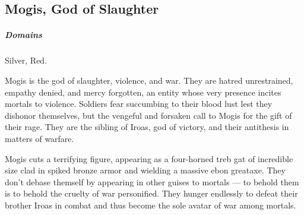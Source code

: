 
\vspace{13.5cm}

\subsection*{Mogis, God of Slaughter} \label{ssec::mogis}
    \subparagraph{Domains} Silver, Red.

    Mogis is the god of slaughter, violence, and war.
    They are hatred unrestrained, empathy denied, and mercy forgotten, an entity whose very presence incites mortals to violence.
    Soldiers fear succumbing to their blood lust lest they dishonor themselves, but the vengeful and forsaken call to Mogis for the gift of their rage.
    They are the sibling of Iroas, god of victory, and their antithesis in matters of warfare.


    Mogis cuts a terrifying figure, appearing as a four-horned treb gat of incredible size clad in spiked bronze armor and wielding a massive ebon greataxe.
    They don't debase themself by appearing in other guises to mortals --- to behold them is to behold the cruelty of war personified.
    They hunger endlessly to defeat their brother Iroas in combat and thus become the sole avatar of war among mortals.

